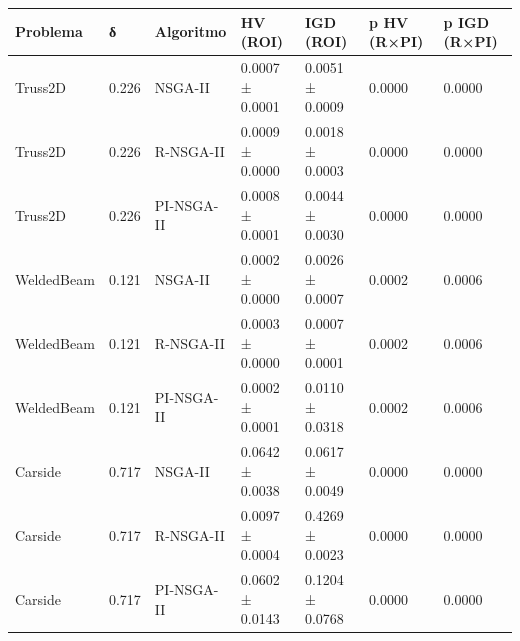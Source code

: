 \begin{tabular}{lllllll}
\toprule
Problema & δ & Algoritmo & HV (ROI) & IGD (ROI) & p HV (R×PI) & p IGD (R×PI) \\
\midrule
Truss2D & 0.226 & NSGA-II & 0.0007 ± 0.0001 & 0.0051 ± 0.0009 & 0.0000 & 0.0000 \\
Truss2D & 0.226 & R-NSGA-II & 0.0009 ± 0.0000 & 0.0018 ± 0.0003 & 0.0000 & 0.0000 \\
Truss2D & 0.226 & PI-NSGA-II & 0.0008 ± 0.0001 & 0.0044 ± 0.0030 & 0.0000 & 0.0000 \\
WeldedBeam & 0.121 & NSGA-II & 0.0002 ± 0.0000 & 0.0026 ± 0.0007 & 0.0002 & 0.0006 \\
WeldedBeam & 0.121 & R-NSGA-II & 0.0003 ± 0.0000 & 0.0007 ± 0.0001 & 0.0002 & 0.0006 \\
WeldedBeam & 0.121 & PI-NSGA-II & 0.0002 ± 0.0001 & 0.0110 ± 0.0318 & 0.0002 & 0.0006 \\
Carside & 0.717 & NSGA-II & 0.0642 ± 0.0038 & 0.0617 ± 0.0049 & 0.0000 & 0.0000 \\
Carside & 0.717 & R-NSGA-II & 0.0097 ± 0.0004 & 0.4269 ± 0.0023 & 0.0000 & 0.0000 \\
Carside & 0.717 & PI-NSGA-II & 0.0602 ± 0.0143 & 0.1204 ± 0.0768 & 0.0000 & 0.0000 \\
\bottomrule
\end{tabular}
